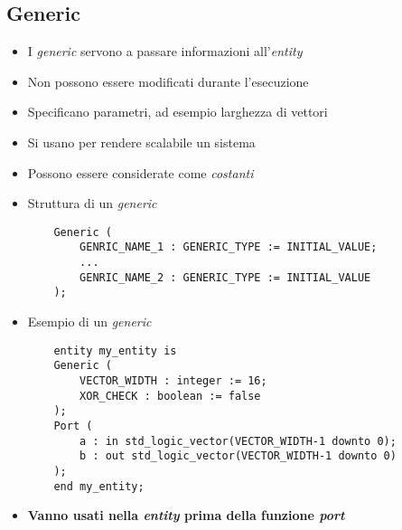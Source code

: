 \documentclass{article}
\begin{document}
\subsection{Generic}
\begin{itemize}
  \item I \textit{generic} servono a passare informazioni all'\textit{entity}
  \item Non possono essere modificati durante l'esecuzione
  \item Specificano parametri, ad esempio larghezza di vettori
  \item Si usano per rendere scalabile un sistema
  \item Possono essere considerate come \textit{costanti}
  \item Struttura di un \textit{generic}
        \begin{verbatim}
    Generic (
        GENRIC_NAME_1 : GENERIC_TYPE := INITIAL_VALUE;
        ...
        GENRIC_NAME_2 : GENERIC_TYPE := INITIAL_VALUE
    );
	      \end{verbatim}
  \item Esempio di un \textit{generic}
        \begin{verbatim}
    entity my_entity is
    Generic (
        VECTOR_WIDTH : integer := 16;
        XOR_CHECK : boolean := false
    );
    Port (
        a : in std_logic_vector(VECTOR_WIDTH-1 downto 0);
        b : out std_logic_vector(VECTOR_WIDTH-1 downto 0)
    );
    end my_entity;
	      \end{verbatim}
  \item \textbf{Vanno usati nella \textit{entity} prima della funzione \textit{port}}
\end{itemize}
\end{document}
